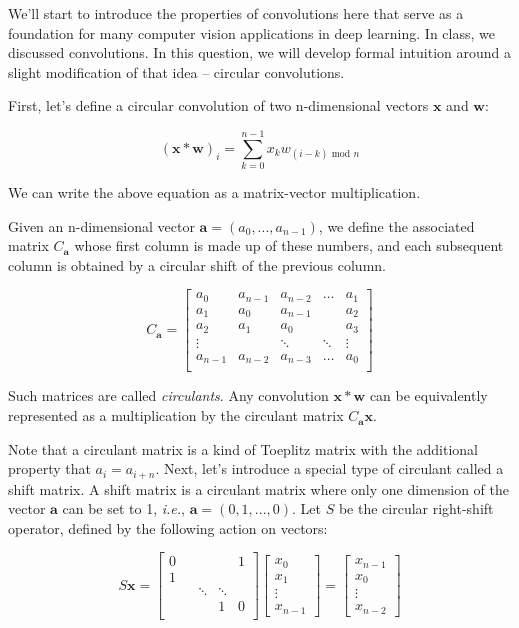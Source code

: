 
We'll start to introduce the properties of convolutions here that serve as a foundation for many computer vision applications in deep learning. 
In class, we discussed convolutions. In this question, we will develop formal intuition around a slight modification of that idea -- circular convolutions. 


First, let's define a circular convolution of two n-dimensional vectors $\mathbf{x}$ and $\mathbf{w}$:

\begin{equation}
(\mathbf{x} * \mathbf{w})_{i} = \sum_{k=0}^{n-1} x_{k} w_{(i-k)\text{ mod } n}  
\end{equation}

We can write the above equation as a matrix-vector multiplication. 

Given an n-dimensional vector $\mathbf{a} = (a_0, ..., a_{n-1})$, we define the associated matrix $C_\mathbf{a}$ whose first column is made up of these numbers, and each subsequent column is obtained by a circular shift of the previous column. 

\[ C_\mathbf{{a}} = 
\begin{bmatrix}
    a_0 & a_{n-1} & a_{n-2} & \dots  & a_1 \\
    a_1 & a_0 & a_{n-1} & & a_2  \\
    a_2 & a_1 & a_0 &  & a_3\\
    \vdots &  & \ddots  & \ddots & \vdots\\
    a_{n-1} & a_{n-2} & a_{n-3} & \dots & a_0 \\
\end{bmatrix}
\]


Such matrices are called \textit{circulants}. Any convolution $\mathbf{x} * \mathbf{w}$ can be equivalently represented as a multiplication by the circulant matrix $C_\mathbf{a}\mathbf{x}$.


Note that a circulant matrix is a kind of Toeplitz matrix with the additional property that $a_i=a_{i+n}$. 
Next, let's introduce a special type of circulant called a shift matrix. A shift matrix is a circulant matrix where only one dimension of the vector $\mathbf{a}$ can be set to 1, \textit{i.e.}, $\mathbf{a} = (0, 1, ..., 0)$. Let $S$  be the circular right-shift operator,
defined by the following action on vectors:

\[ S\mathbf{x} = 
\begin{bmatrix}
    0 &  &  &  & 1 \\
    1 &  &  & & \\
    &  & \ddots & \ddots & \\
    &  &  & 1 & 0 \\
\end{bmatrix}
\begin{bmatrix}
    x_0 \\
    x_1 \\
    \vdots \\
    x_{n-1}
\end{bmatrix}
=
\begin{bmatrix}
    x_{n-1} \\
    x_0 \\
    \vdots \\
    x_{n-2}
\end{bmatrix}
\]


